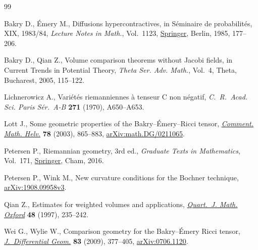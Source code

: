 \documentclass[10pt,a4paper]{amsart}
\numberwithin{equation}{section}
\begin{document}
\begin{thebibliography}{99}
\footnotesize\itemsep=0pt

Bakry D., \'{E}mery M., Diffusions hypercontractives, in S\'eminaire de
 probabilit\'es, {XIX}, 1983/84, \textit{Lecture Notes in Math.}, Vol.~1123,
 \href{https://doi.org/10.1007/BFb0075847}{Springer}, Berlin, 1985, 177--206.

Bakry D., Qian Z., Volume comparison theorems without {J}acobi fields, in
 Current Trends in Potential Theory, \textit{Theta Ser. Adv. Math.}, Vol.~4,
 Theta, Bucharest, 2005, 115--122.

Lichnerowicz A., Vari\'et\'es riemanniennes \`a tenseur {C} non n\'egatif,
 \textit{C.~R.~Acad. Sci. Paris S\'er.~A-B} \textbf{271} (1970), A650--A653.

Lott J., Some geometric properties of the {B}akry--\'{E}mery--{R}icci tensor,
 \href{https://doi.org/10.1007/s00014-003-0775-8}{\textit{Comment. Math. Helv.}} \textbf{78} (2003), 865--883, \href{https://arxiv.org/abs/math.DG/0211065}{arXiv:math.DG/0211065}.

Petersen P., Riemannian geometry, 3rd ed., \textit{Graduate Texts in Mathematics}, Vol.~171, \href{https://doi.org/10.1007/978-3-319-26654-1}{Springer}, Cham, 2016.

Petersen P., Wink M., New curvature conditions for the {B}ochner technique,
 \href{https://arxiv.org/abs/1908.09958v3}{arXiv:1908.09958v3}.

Qian Z., Estimates for weighted volumes and applications, \href{https://doi.org/10.1093/qmath/48.2.235}{\textit{Quart.~J.
 Math. Oxford}} \textbf{48} (1997), 235--242.

Wei G., Wylie W., Comparison geometry for the {B}akry--\'{E}mery {R}icci tensor,
 \href{https://doi.org/10.4310/jdg/1261495336}{\textit{J.~Differential Geom.}} \textbf{83} (2009), 377--405, \href{https://arxiv.org/abs/0706.1120}{arXiv:0706.1120}.

\end{thebibliography}
\end{document}
